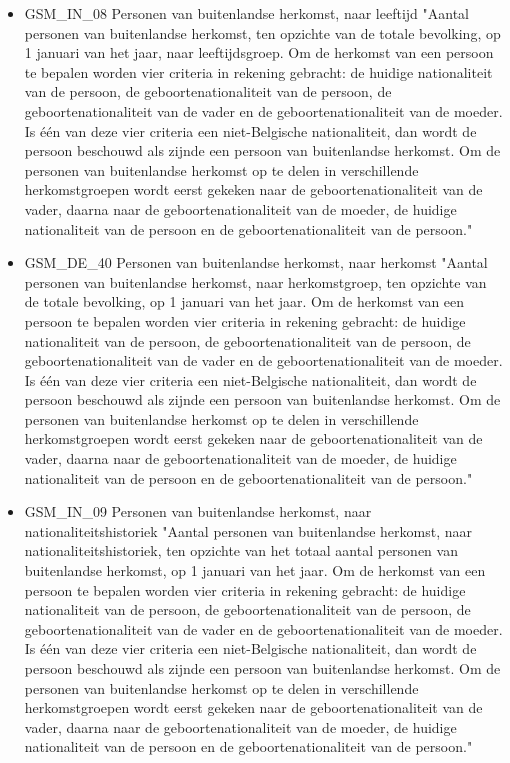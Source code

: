 \documentclass{SVnote}
\begin{document}
\begin{itemize}
\item GSM\_IN\_08	Personen van buitenlandse herkomst, naar leeftijd		"Aantal personen van buitenlandse herkomst, ten opzichte van de totale bevolking, op 1 januari van het jaar, naar leeftijdsgroep.
Om de herkomst van een persoon te bepalen worden vier criteria in rekening gebracht: de huidige nationaliteit van de persoon, de geboortenationaliteit van de persoon, de geboortenationaliteit van de vader en de geboortenationaliteit van de moeder. Is één van deze vier criteria een niet-Belgische nationaliteit, dan wordt de persoon beschouwd als zijnde een persoon van buitenlandse herkomst. Om de personen van buitenlandse herkomst op te delen in verschillende herkomstgroepen wordt eerst gekeken naar de geboortenationaliteit van de vader, daarna naar de geboortenationaliteit van de moeder, de huidige nationaliteit van de persoon en de geboortenationaliteit van de persoon."
\item GSM\_DE\_40	Personen van buitenlandse herkomst, naar herkomst		"Aantal personen van buitenlandse herkomst, naar herkomstgroep, ten opzichte van de totale bevolking, op 1 januari van het jaar.
Om de herkomst van een persoon te bepalen worden vier criteria in rekening gebracht: de huidige nationaliteit van de persoon, de geboortenationaliteit van de persoon, de geboortenationaliteit van de vader en de geboortenationaliteit van de moeder. Is één van deze vier criteria een niet-Belgische nationaliteit, dan wordt de persoon beschouwd als zijnde een persoon van buitenlandse herkomst. Om de personen van buitenlandse herkomst op te delen in verschillende herkomstgroepen wordt eerst gekeken naar de geboortenationaliteit van de vader, daarna naar de geboortenationaliteit van de moeder, de huidige nationaliteit van de persoon en de geboortenationaliteit van de persoon."
\item GSM\_IN\_09	Personen van buitenlandse herkomst, naar nationaliteitshistoriek		"Aantal personen van buitenlandse herkomst, naar nationaliteitshistoriek, ten opzichte van het totaal aantal personen van buitenlandse herkomst, op 1 januari van het jaar.
Om de herkomst van een persoon te bepalen worden vier criteria in rekening gebracht: de huidige nationaliteit van de persoon, de geboortenationaliteit van de persoon, de geboortenationaliteit van de vader en de geboortenationaliteit van de moeder. Is één van deze vier criteria een niet-Belgische nationaliteit, dan wordt de persoon beschouwd als zijnde een persoon van buitenlandse herkomst. Om de personen van buitenlandse herkomst op te delen in verschillende herkomstgroepen wordt eerst gekeken naar de geboortenationaliteit van de vader, daarna naar de geboortenationaliteit van de moeder, de huidige nationaliteit van de persoon en de geboortenationaliteit van de persoon."

\end{itemize}
\end{document}
